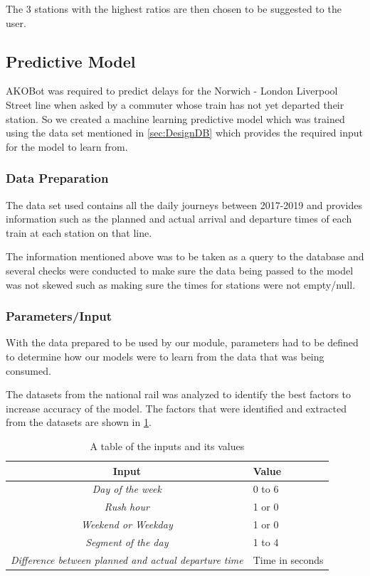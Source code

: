 \documentclass[11pt]{article}
\begin{document}
        The 3 stations with the highest ratios are then chosen to be suggested to the user.

    \subsection{Predictive Model}
    AKOBot was required to predict delays for the Norwich - London Liverpool Street line when asked by a commuter whose train has not yet departed their station. So we created a machine learning predictive model which was trained using the data set mentioned in \cref{sec:DesignDB} which provides the required input for the model to learn from.
        
        \subsubsection{Data Preparation}\label{sec:DesignModelPrep}
        The data set used contains all the daily journeys between 2017-2019 and provides information such as the planned and actual arrival and departure times of each train at each station on that line.

        The information mentioned above was to be taken as a query to the database and several checks were conducted to make sure the data being passed to the model was not skewed such as making sure the times for stations were not empty/null.

        \subsubsection{Parameters/Input}
        With the data prepared to be used by our module, parameters had to be defined to determine how our models were to learn from the data that was being consumed. 
    
        The datasets from the national rail was analyzed to identify the best factors to increase accuracy of the model. The factors that were identified and extracted from the datasets are shown in \cref{tab:ModelInput}.

\begin{table}[!ht]
\centering
\begin{tabular}{|c|l|}
\hline
\textbf{Input}                                                & \textbf{Value}  \\ \hline
\textit{Day of the week}                                      & 0 to 6          \\ \hline
\textit{Rush hour}                                            & 1 or 0          \\ \hline
\textit{Weekend or Weekday}                                   & 1 or 0          \\ \hline
\textit{Segment of the day}                                   & 1 to 4          \\ \hline
\textit{Difference between planned and actual departure time} & Time in seconds \\ \hline
\end{tabular}
\caption{A table of the inputs and its values}
\label{tab:ModelInput}
\end{table}
    
\end{document}
